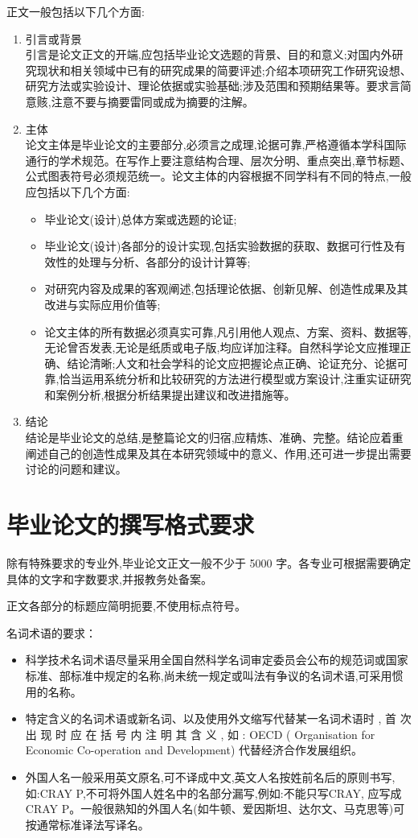 \documentclass{sysuthesis}
\begin{document}
正文一般包括以下几个方面:

\begin{enumerate}
\item 引言或背景\\
引言是论文正文的开端,应包括毕业论文选题的背景、目的和意义;对国内外研究现状和相关领域中已有的研究成果的简要评述;介绍本项研究工作研究设想、研究方法或实验设计、理论依据或实验基础;涉及范围和预期结果等。要求言简意赅,注意不要与摘要雷同或成为摘要的注解。
\item 主体\\
论文主体是毕业论文的主要部分,必须言之成理,论据可靠,严格遵循本学科国际通行的学术规范。在写作上要注意结构合理、层次分明、重点突出,章节标题、公式图表符号必须规范统一。论文主体的内容根据不同学科有不同的特点,一般应包括以下几个方面:
\begin{itemize}
\item 毕业论文(设计)总体方案或选题的论证;
\item 毕业论文(设计)各部分的设计实现,包括实验数据的获取、数据可行性及有效性的处理与分析、各部分的设计计算等;
\item 对研究内容及成果的客观阐述,包括理论依据、创新见解、创造性成果及其改进与实际应用价值等;
\item 论文主体的所有数据必须真实可靠,凡引用他人观点、方案、资料、数据等,无论曾否发表,无论是纸质或电子版,均应详加注释。自然科学论文应推理正确、结论清晰;人文和社会学科的论文应把握论点正确、论证充分、论据可靠,恰当运用系统分析和比较研究的方法进行模型或方案设计,注重实证研究和案例分析,根据分析结果提出建议和改进措施等。
\end{itemize}
\item 结论\\
结论是毕业论文的总结,是整篇论文的归宿,应精炼、准确、完整。结论应着重阐述自己的创造性成果及其在本研究领域中的意义、作用,还可进一步提出需要讨论的问题和建议。
\end{enumerate}

\section{毕业论文的撰写格式要求}

除有特殊要求的专业外,毕业论文正文一般不少于 5000 字。各专业可根据需要确定具体的文字和字数要求,并报教务处备案。

正文各部分的标题应简明扼要,不使用标点符号。

名词术语的要求：

\begin{itemize}
\item 科学技术名词术语尽量采用全国自然科学名词审定委员会公布的规范词或国家标准、部标准中规定的名称,尚未统一规定或叫法有争议的名词术语,可采用惯用的名称。
\item 特定含义的名词术语或新名词、以及使用外文缩写代替某一名词术语时 , 首 次 出 现 时 应 在 括 号 内 注 明 其 含 义 , 如 : OECD ( Organisation for Economic Co-operation and Development) 代替经济合作发展组织。
\item 外国人名一般采用英文原名,可不译成中文,英文人名按姓前名后的原则书写,如:CRAY P,不可将外国人姓名中的名部分漏写,例如:不能只写CRAY, 应写成 CRAY P。一般很熟知的外国人名(如牛顿、爱因斯坦、达尔文、马克思等)可按通常标准译法写译名。
\end{itemize}
\end{document}

